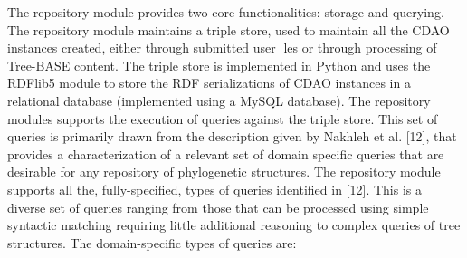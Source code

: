 \documentclass[10pt]{article}
\begin{document}
The repository module provides two core functionalities: storage and querying. The repository module maintains a triple store, used to maintain all
the CDAO instances created, either through submitted user les or through processing of Tree-BASE content. The triple store is implemented in
Python and uses the RDFlib5 module to store the RDF serializations of CDAO instances in a relational database (implemented using a MySQL database).
The repository modules supports the execution of queries against the triple store. This set of queries is primarily drawn from the description given by Nakhleh et al. [12], 
that provides a characterization of a relevant set of domain specific queries that are desirable for any repository of phylogenetic structures. The repository module supports
 all the, fully-specified, types of queries identified in [12]. This is a diverse set of queries ranging from those that can be processed using simple syntactic matching requiring little additional reasoning to complex queries of tree structures. The domain-specific types of queries are:
\end{document}
